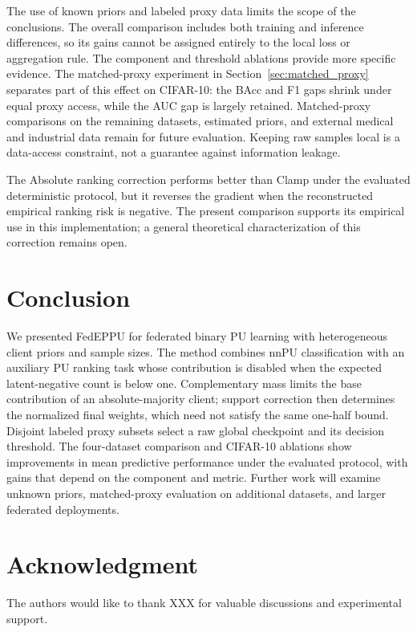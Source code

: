 \documentclass[lettersize,journal]{IEEEtran}
\begin{document}
The use of known priors and labeled proxy data limits the scope of the conclusions. The overall comparison includes both training and inference differences, so its gains cannot be assigned entirely to the local loss or aggregation rule. The component and threshold ablations provide more specific evidence. The matched-proxy experiment in Section~\ref{sec:matched_proxy} separates part of this effect on CIFAR-10: the BAcc and F1 gaps shrink under equal proxy access, while the AUC gap is largely retained. Matched-proxy comparisons on the remaining datasets, estimated priors, and external medical and industrial data remain for future evaluation. Keeping raw samples local is a data-access constraint, not a guarantee against information leakage.

The Absolute ranking correction performs better than Clamp under the evaluated deterministic protocol, but it reverses the gradient when the reconstructed empirical ranking risk is negative. The present comparison supports its empirical use in this implementation; a general theoretical characterization of this correction remains open.

\section{Conclusion}

We presented FedEPPU for federated binary PU learning with heterogeneous client priors and sample sizes. The method combines nnPU classification with an auxiliary PU ranking task whose contribution is disabled when the expected latent-negative count is below one. Complementary mass limits the base contribution of an absolute-majority client; support correction then determines the normalized final weights, which need not satisfy the same one-half bound. Disjoint labeled proxy subsets select a raw global checkpoint and its decision threshold. The four-dataset comparison and CIFAR-10 ablations show improvements in mean predictive performance under the evaluated protocol, with gains that depend on the component and metric. Further work will examine unknown priors, matched-proxy evaluation on additional datasets, and larger federated deployments.

\section*{Acknowledgment}

The authors would like to thank XXX for valuable discussions and experimental support.
\end{document}
